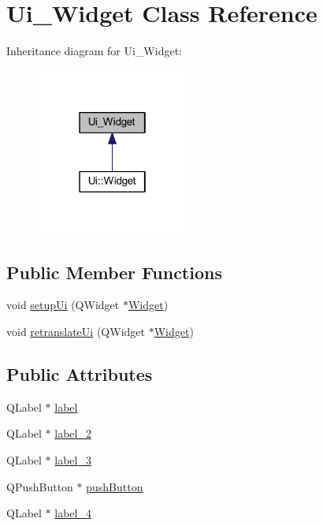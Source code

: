 \hypertarget{class_ui___widget}{}\section{Ui\_Widget Class Reference}
\label{class_ui___widget}


Inheritance diagram for Ui\_Widget:\nopagebreak
\begin{figure}[H]
\begin{center}
\leavevmode
\includegraphics[width=142pt]{class_ui___widget__inherit__graph}
\end{center}
\end{figure}
\subsection*{Public Member Functions}
\begin{DoxyCompactItemize}
\item 
void \hyperlink{class_ui___widget_a9039ed8704971418cbe19ef8c9eea266}{setupUi} (QWidget $\ast$\hyperlink{class_widget}{Widget})
\item 
void \hyperlink{class_ui___widget_ae1cb85db8d3658df8dcd104361edcecb}{retranslateUi} (QWidget $\ast$\hyperlink{class_widget}{Widget})
\end{DoxyCompactItemize}
\subsection*{Public Attributes}
\begin{DoxyCompactItemize}
\item 
QLabel $\ast$ \hyperlink{class_ui___widget_a3126b93450dcc18cede73b9d1ee7c6b0}{label}
\item 
QLabel $\ast$ \hyperlink{class_ui___widget_a6f06b143349464b5b19ac0ffe2fc084d}{label\_2}
\item 
QLabel $\ast$ \hyperlink{class_ui___widget_adfcab5569ac08da197e14dba01390755}{label\_3}
\item 
QPushButton $\ast$ \hyperlink{class_ui___widget_a7dcf5da8902069415662905e93b0d5cb}{pushButton}
\item 
QLabel $\ast$ \hyperlink{class_ui___widget_a7d22bf9c5cf51754b1c145db5ca0da79}{label\_4}
\end{DoxyCompactItemize}


